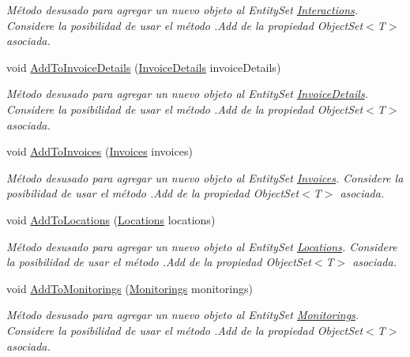 \begin{DoxyCompactItemize}
\begin{DoxyCompactList}\small\item\em Método desusado para agregar un nuevo objeto al Entity\-Set \hyperlink{class_game_memory_1_1_interactions}{Interactions}. Considere la posibilidad de usar el método .Add de la propiedad Object\-Set$<$T$>$ asociada. \end{DoxyCompactList}\item 
void \hyperlink{class_game_memory_1_1_o_m_k_t_d_b_entities_ab288fd2c58e6f298a4c74b584b82f060}{Add\-To\-Invoice\-Details} (\hyperlink{class_game_memory_1_1_invoice_details}{Invoice\-Details} invoice\-Details)
\begin{DoxyCompactList}\small\item\em Método desusado para agregar un nuevo objeto al Entity\-Set \hyperlink{class_game_memory_1_1_invoice_details}{Invoice\-Details}. Considere la posibilidad de usar el método .Add de la propiedad Object\-Set$<$T$>$ asociada. \end{DoxyCompactList}\item 
void \hyperlink{class_game_memory_1_1_o_m_k_t_d_b_entities_a0ce70d69289c3488b6f582ed60f5ec58}{Add\-To\-Invoices} (\hyperlink{class_game_memory_1_1_invoices}{Invoices} invoices)
\begin{DoxyCompactList}\small\item\em Método desusado para agregar un nuevo objeto al Entity\-Set \hyperlink{class_game_memory_1_1_invoices}{Invoices}. Considere la posibilidad de usar el método .Add de la propiedad Object\-Set$<$T$>$ asociada. \end{DoxyCompactList}\item 
void \hyperlink{class_game_memory_1_1_o_m_k_t_d_b_entities_a3c25b648c0400245ff6ca894c073fcbb}{Add\-To\-Locations} (\hyperlink{class_game_memory_1_1_locations}{Locations} locations)
\begin{DoxyCompactList}\small\item\em Método desusado para agregar un nuevo objeto al Entity\-Set \hyperlink{class_game_memory_1_1_locations}{Locations}. Considere la posibilidad de usar el método .Add de la propiedad Object\-Set$<$T$>$ asociada. \end{DoxyCompactList}\item 
void \hyperlink{class_game_memory_1_1_o_m_k_t_d_b_entities_a8a56f9ac74083756b2011a43e65b311c}{Add\-To\-Monitorings} (\hyperlink{class_game_memory_1_1_monitorings}{Monitorings} monitorings)
\begin{DoxyCompactList}\small\item\em Método desusado para agregar un nuevo objeto al Entity\-Set \hyperlink{class_game_memory_1_1_monitorings}{Monitorings}. Considere la posibilidad de usar el método .Add de la propiedad Object\-Set$<$T$>$ asociada. \end{DoxyCompactList}\item 

\end{DoxyCompactItemize}
